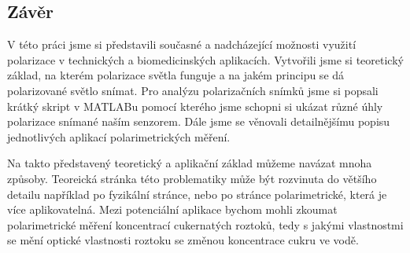 \documentclass[a4paper]{article}
\numberwithin{equation}{section}
\begin{document}

    \newpage
    \subsection{Závěr}
    V této práci jsme si představili současné a nadcházející možnosti využití polarizace v technických a biomedicinských aplikacích. Vytvořili jsme si teoretický základ, na kterém polarizace světla funguje a na jakém principu se dá polarizované světlo snímat. Pro analýzu polarizačních snímků jsme si popsali krátký skript v MATLABu pomocí kterého jsme schopni si ukázat různé úhly polarizace snímané naším senzorem. Dále jsme se věnovali detailnějšímu popisu jednotlivých aplikací polarimetrických měření.
    \par Na takto představený teoretický a aplikační základ můžeme navázat mnoha způsoby. Teoreická stránka této problematiky může být rozvinuta do většího detailu například po fyzikální stránce, nebo po stránce polarimetrické, která je více aplikovatelná. Mezi potenciální aplikace bychom mohli zkoumat polarimetrické měření koncentrací cukernatých roztoků, tedy s jakými vlastnostmi se mění optické vlastnosti roztoku se změnou koncentrace cukru ve vodě. 
\end{document}
